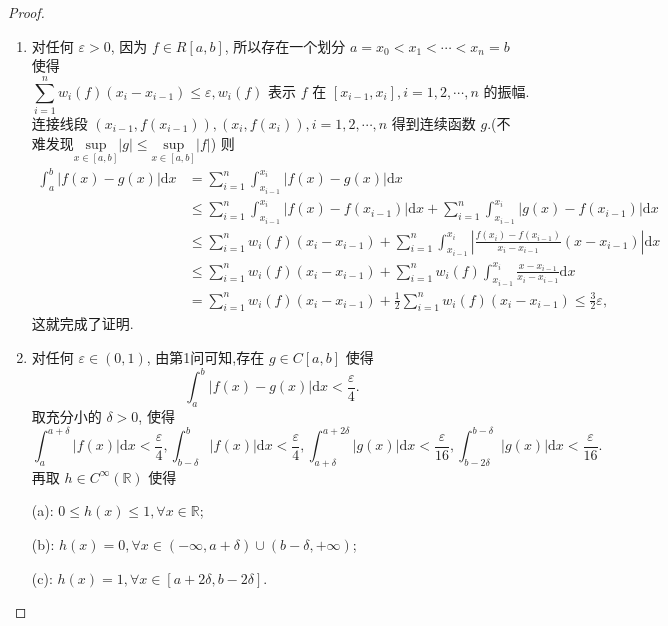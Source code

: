\documentclass[../../main.tex]{subfiles}
\begin{document}
\begin{proof}
\begin{enumerate}[(1)]
\item 对任何 $\varepsilon > 0$, 因为 $f \in R[a,b]$, 所以存在一个划分 $a = x_0 < x_1 < \cdots < x_n = b$ 使得
\[
\sum_{i = 1}^{n} w_i(f)(x_i - x_{i - 1}) \leqslant \varepsilon, w_i(f) \text{ 表示 } f \text{ 在 } [x_{i - 1},x_i], i = 1,2,\cdots,n \text{ 的振幅}.
\]
连接线段 $(x_{i - 1},f(x_{i - 1})),(x_i,f(x_i)), i = 1,2,\cdots,n$ 得到连续函数 $g$.(不难发现$\underset{x\in \left[ a,b \right]}{\mathrm{sup}}\left| g \right|\leqslant \underset{x\in \left[ a,b \right]}{\mathrm{sup}}\left| f \right|$) 则
\begin{align*}
\int_{a}^{b} |f(x) - g(x)|\mathrm{d}x &= \sum_{i = 1}^{n} \int_{x_{i - 1}}^{x_i} |f(x) - g(x)|\mathrm{d}x \\
&\leqslant \sum_{i = 1}^{n} \int_{x_{i - 1}}^{x_i} |f(x) - f(x_{i - 1})|\mathrm{d}x + \sum_{i = 1}^{n} \int_{x_{i - 1}}^{x_i} |g(x) - f(x_{i - 1})|\mathrm{d}x \\
&\leqslant \sum_{i = 1}^{n} w_i(f)(x_i - x_{i - 1}) + \sum_{i = 1}^{n} \int_{x_{i - 1}}^{x_i} \left| \frac{f(x_i) - f(x_{i - 1})}{x_i - x_{i - 1}} (x - x_{i - 1}) \right|\mathrm{d}x \\
&\leqslant \sum_{i = 1}^{n} w_i(f)(x_i - x_{i - 1}) + \sum_{i = 1}^{n} w_i(f) \int_{x_{i - 1}}^{x_i} \frac{x - x_{i - 1}}{x_i - x_{i - 1}}\mathrm{d}x \\
&= \sum_{i = 1}^{n} w_i(f)(x_i - x_{i - 1}) + \frac{1}{2} \sum_{i = 1}^{n} w_i(f)(x_i - x_{i - 1}) \leqslant \frac{3}{2}\varepsilon,
\end{align*}
这就完成了证明.

\item 对任何 $\varepsilon \in (0,1)$, 由第1问可知,存在 $g \in C[a,b]$ 使得
\[
\int_{a}^{b} |f(x) - g(x)|\mathrm{d}x < \frac{\varepsilon}{4}.
\]
取充分小的 $\delta > 0$, 使得
\[
\int_{a}^{a + \delta} |f(x)|\mathrm{d}x < \frac{\varepsilon}{4}, \int_{b - \delta}^{b} |f(x)|\mathrm{d}x < \frac{\varepsilon}{4}, \int_{a + \delta}^{a + 2\delta} |g(x)|\mathrm{d}x < \frac{\varepsilon}{16}, \int_{b - 2\delta}^{b - \delta} |g(x)|\mathrm{d}x < \frac{\varepsilon}{16}.
\]
再取 $h \in C^{\infty}(\mathbb{R})$ 使得

(a): $0 \leqslant h(x) \leqslant 1, \forall x \in \mathbb{R}$;

(b): $h(x) = 0, \forall x \in (-\infty,a + \delta) \cup (b - \delta,+\infty)$;

(c): $h(x) = 1, \forall x \in [a + 2\delta,b - 2\delta]$.


\end{enumerate}
\end{proof}
\end{document}

